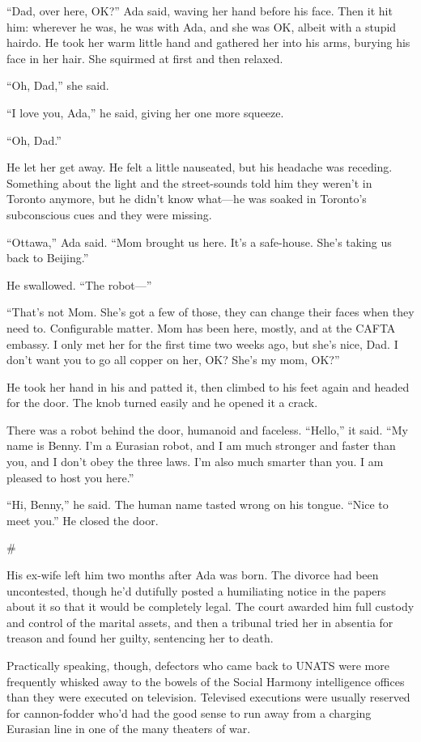 “Dad, over here, OK?” Ada said, waving her hand before his face.
Then it hit him: wherever he was, he was with Ada, and she was OK,
albeit with a stupid hairdo. He took her warm little hand and
gathered her into his arms, burying his face in her hair. She
squirmed at first and then relaxed.

“Oh, Dad,” she said.

“I love you, Ada,” he said, giving her one more squeeze.

“Oh, Dad.”

He let her get away. He felt a little nauseated, but his headache
was receding. Something about the light and the street-sounds told
him they weren’t in Toronto anymore, but he didn’t know what—he was
soaked in Toronto’s subconscious cues and they were missing.

“Ottawa,” Ada said. “Mom brought us here. It’s a safe-house. She’s
taking us back to Beijing.”

He swallowed. “The robot—”

“That’s not Mom. She’s got a few of those, they can change their
faces when they need to. Configurable matter. Mom has been here,
mostly, and at the CAFTA embassy. I only met her for the first time
two weeks ago, but she’s nice, Dad. I don’t want you to go all
copper on her, OK? She’s my mom, OK?”

He took her hand in his and patted it, then climbed to his feet
again and headed for the door. The knob turned easily and he opened
it a crack.

There was a robot behind the door, humanoid and faceless. “Hello,”
it said. “My name is Benny. I’m a Eurasian robot, and I am much
stronger and faster than you, and I don’t obey the three laws. I’m
also much smarter than you. I am pleased to host you here.”

“Hi, Benny,” he said. The human name tasted wrong on his tongue.
“Nice to meet you.” He closed the door.

\#

His ex-wife left him two months after Ada was born. The divorce had
been uncontested, though he’d dutifully posted a humiliating notice
in the papers about it so that it would be completely legal. The
court awarded him full custody and control of the marital assets,
and then a tribunal tried her in absentia for treason and found her
guilty, sentencing her to death.

Practically speaking, though, defectors who came back to UNATS were
more frequently whisked away to the bowels of the Social Harmony
intelligence offices than they were executed on television.
Televised executions were usually reserved for cannon-fodder who’d
had the good sense to run away from a charging Eurasian line in one
of the many theaters of war.


